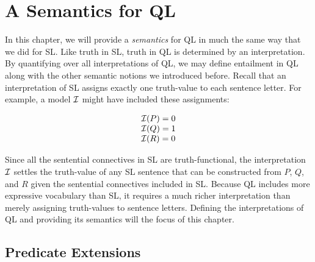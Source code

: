 ﻿%
\chapter{A Semantics for QL}
\label{ch.FOL-semantics}




In this chapter, we will provide a \emph{semantics} for QL in much the same way that we did for SL.
Like truth in SL, truth in QL is determined by an interpretation.
By quantifying over all interpretations of QL, we may define entailment in QL along with the other semantic notions we introduced before.
Recall that an interpretation of SL assigns exactly one truth-value to each sentence letter.
For example, a model $\mathcal{I}$ might have included these assignments:

\begin{displaymath}
	\begin{array}{ll}
    \mathcal{I}(P) = 0\\
    \mathcal{I}(Q) = 1\\
    \mathcal{I}(R) = 0
	\end{array}
\end{displaymath}

Since all the sentential connectives in SL are truth-functional, the interpretation $\mathcal{I}$ settles the truth-value of any SL sentence that can be constructed from $P$, $Q$, and $R$ given the sentential connectives included in SL.
Because QL includes more expressive vocabulary than SL, it requires a much richer interpretation than merely assigning truth-values to sentence letters.
Defining the interpretations of QL and providing its semantics will the focus of this chapter.





\section{Predicate Extensions}


